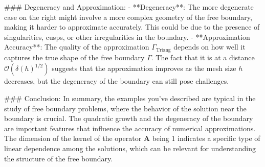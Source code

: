 ### Degeneracy and Approximation:
- **Degeneracy**: The more degenerate case on the right might involve a more complex geometry of the free boundary, making it harder to approximate accurately. This could be due to the presence of singularities, cusps, or other irregularities in the boundary.
- **Approximation Accuracy**: The quality of the approximation \(\Gamma_{\text{Triang}}\) depends on how well it captures the true shape of the free boundary \(\Gamma\). The fact that it is at a distance \(\mathcal{O}(\delta(h)^{1/2})\) suggests that the approximation improves as the mesh size \(h\) decreases, but the degeneracy of the boundary can still pose challenges.

### Conclusion:
In summary, the examples you've described are typical in the study of free boundary problems, where the behavior of the solution near the boundary is crucial. The quadratic growth and the degeneracy of the boundary are important features that influence the accuracy of numerical approximations. The dimension of the kernel of the operator \(\mathbf{A}\) being 1 indicates a specific type of linear dependence among the solutions, which can be relevant for understanding the structure of the free boundary.